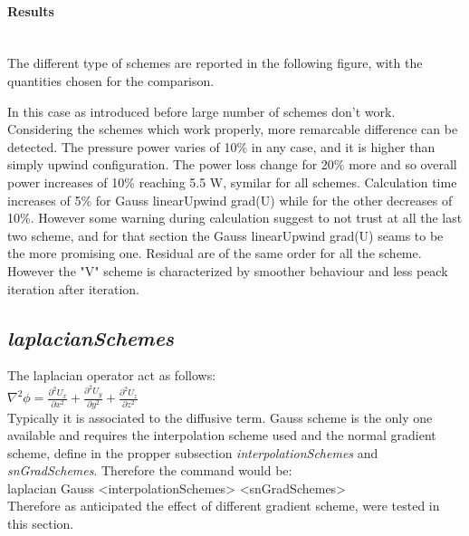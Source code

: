 \documentclass[a4paper,12pt]{article}
\begin{document}
\paragraph{Results} \mbox{}\\
The different type of schemes are reported in the following figure, with the quantities chosen for the comparison. 

In this case as introduced before large number of schemes don't work. Considering the schemes which work properly, more remarcable difference can be detected.
The pressure power varies of 10\% in any case, and it is higher than simply upwind configuration. The power loss change for 20\% more and so overall power increases of 10\% reaching 5.5 W, symilar for all schemes. Calculation time increases of 5\% for Gauss linearUpwind grad(U) while for the other decreases of 10\%. However some warning during calculation suggest to not trust at all the last two scheme, and for that section the Gauss linearUpwind grad(U) seams to be the more promising one. Residual are of the same order for all the scheme. However the "V" scheme is characterized by smoother behaviour and less peack iteration after iteration. %


\subsection{\textit{laplacianSchemes}}
The laplacian operator act as follows:
\\ $ \nabla^2 \phi = \frac{\partial^2 U_x}{\partial x^2}+ \frac{\partial^2 U_y}{\partial y^2} + \frac{\partial^2 U_z}{\partial z^2} $
\\ Typically it is associated to the diffusive term. Gauss scheme is the only one available and requires the interpolation scheme used and the normal gradient scheme, define in the propper subsection \textit{interpolationSchemes} and \textit{snGradSchemes}. Therefore the command would be:
\\ {\ttfamily laplacian	Gauss	<interpolationSchemes>		<snGradSchemes>}
\\ Therefore as anticipated the effect of different gradient scheme, were tested in this section.
\end{document}

